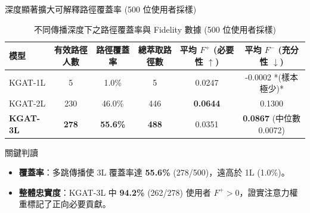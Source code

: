 \documentclass[aspectratio=169, 10pt]{beamer}
\begin{document}
\begin{frame}{深度顯著擴大可解釋路徑覆蓋率 (500 位使用者採樣)}
  \begin{table}
    \centering
    \caption{不同傳播深度下之路徑覆蓋率與 Fidelity 數據 (500 位使用者採樣)}
    \begin{tabular}{l c c c c c}
      \toprule
      \textbf{模型} & \textbf{有效路徑人數} & \textbf{路徑覆蓋率} & \textbf{總萃取路徑數} & \textbf{平均 $F^+$ (必要性 $\uparrow$)} & \textbf{平均 $F^-$ (充分性 $\downarrow$)} \\
      \midrule
      KGAT-1L & 5 & 1.0\% & 5 & 0.0247 & -0.0002 *(樣本極少)* \\
      KGAT-2L & 230 & 46.0\% & 446 & \textbf{0.0644} & 0.1300 \\
      \textbf{KGAT-3L} & \textbf{278} & \textbf{55.6\%} & \textbf{488} & 0.0351 & \textbf{0.0867} (中位數 0.0072) \\
      \bottomrule
    \end{tabular}
  \end{table}
  
  \begin{exampleblock}{關鍵判讀}
    \begin{itemize}
      \item \textbf{覆蓋率}：多跳傳播使 3L 覆蓋率達 \textbf{55.6\%} (278/500)，遠高於 1L (1.0\%)。
      \item \textbf{整體忠實度}：KGAT-3L 中 \textbf{94.2\%} (262/278) 使用者 $F^+ > 0$，證實注意力權重標記了正向必要貢獻。
    \end{itemize}
  \end{exampleblock}
\end{frame}
\end{document}
